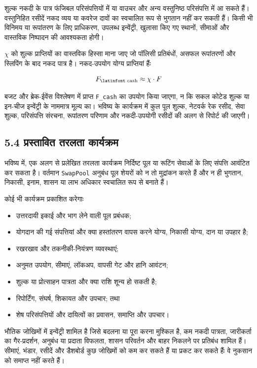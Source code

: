\documentclass[11pt]{article}
\begin{document}
शुल्क नकदी के पात्र फंजिबल परिसंपत्तियों में या वाउचर और अन्य वस्तुनिष्ठ परिसंपत्ति में आ सकते हैं। वस्तुनिहित रसीदें नकद व्यय या कवरेज दावों का स्वचालित रूप से भुगतान नहीं कर सकती हैं। किसी भी विनिमय या रूपांतरण के लिए प्राधिकरण, उपलब्ध इन्वेंट्री, खुलासा किए गए स्थानों, सीमाओं और वास्तविक निष्पादन की आवश्यकता होगी।

\texttt{$\chi$} को शुल्क प्राप्तियों का वास्तविक हिस्सा माना जाए जो पॉलिसी प्रतिबंधों, असफल रूपांतरणों और स्लिपिंग के बाद नकद पात्र है। नकद-उपयोग योग्य प्राप्तियां हैंः

\[
F_{\text{\latinfont cash}} \approx \chi \cdot F
\]

बजट और ब्रेक-ईवेंस विश्लेषण में प्राप्त \texttt{F\_cash} का उपयोग किया जाएगा, न कि सकल कोटेड शुल्क या इन-चीज इन्वेंट्री के नाममात्र मूल्य का। भविष्य के कार्यक्रम में कुल पूल शुल्क, नेटवर्क रेक रसीद, सेवा शुल्क, परिसंपत्ति संरचना, रूपांतरण परिणाम और नकदी-उपयोगी रसीदों की अलग से रिपोर्ट की जाएगी।

\subsection*{5.4 प्रस्तावित तरलता कार्यक्रम}

भविष्य में, एक अलग से प्रलेखित तरलता कार्यक्रम निर्दिष्ट पूल या रूटिंग सेवाओं के लिए संपत्ति आवंटित कर सकता है। वर्तमान \texttt{SwapPool} अनुबंध पूल शेयरों को न तो मुद्रांकन करते हैं और न ही भुगतान, निकासी, इनाम, शासन या लाभ अधिकार स्वचालित रूप से बनाते हैं।

कोई भी कार्यक्रम प्रकाशित करेगाः

\begin{itemize}[leftmargin=*]
\item उत्तरदायी इकाई और भाग लेने वाली पूल प्रबंधक;
\item योगदान की गई संपत्तियां और क्या हस्तांतरण वापस करने योग्य, निकासी योग्य, दान या उपहार है;
\item रखरखाव और तकनीकी-नियंत्रण व्यवस्थाएं;
\item अनुमत उपयोग, सीमाएं, लॉकअप, वापसी गेट और हानि आवंटन;
\item शुल्क या प्रोत्साहन पात्रता और क्या राशि शून्य हो सकती है;
\item रिपोर्टिंग, संघर्ष, शिकायत और उपचार; तथा
\item शेष परिसंपत्तियों और दायित्वों का प्रवासन, समाप्ति और उपचार।
\end{itemize}
भौतिक जोखिमों में इन्वेंट्री शामिल है जिसे बदलना या पूरा करना मुश्किल है, कम नकदी पात्रता, जारीकर्ता का गैर-प्रदर्शन, अनुबंध या प्रदाता विफलता, शासन परिवर्तन और बाहर निकलने पर प्रतिबंध शामिल हैं। सीमाएं, भंडार, रसीदें और डैशबोर्ड कुछ जोखिमों को कम कर सकते हैं या प्रकट कर सकते हैंः वे नुकसान को समाप्त नहीं करते हैं।
\end{document}
